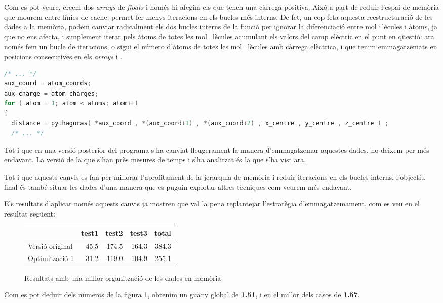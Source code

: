 Com es pot veure, creem dos \emph{arrays} de \emph{floats} i només hi afegim els que tenen una càrrega positiva. Això a part de reduir l'espai de memòria que mourem entre línies de cache, permet fer menys iteracions en els bucles més interns. De fet, un cop feta aquesta reestructuració de les dades a la memòria, podem canviar radicalment els dos bucles interns de la funció per ignorar la diferenciació entre mol·lècules i àtoms, ja que no ens afecta, i simplement iterar pels àtoms de totes les mol·lècules acumulant els valors del camp elèctric en el punt en qüestió: ara només fem un bucle de  iteracions, o sigui el número d'àtoms de totes les mol·lècules amb càrrega elèctrica, i que tenim emmagatzemats en posicions consecutives en els \emph{arrays}  i .

\begin{lstlisting}[label=mem2, caption=Bucle intern que substitueix els anteriors 2 bucles més interns, language=C]
/* ... */
aux_coord = atom_coords;
aux_charge = atom_charges;
for ( atom = 1; atom < atoms; atom++)
{
  distance = pythagoras( *aux_coord , *(aux_coord+1) , *(aux_coord+2) , x_centre , y_centre , z_centre ) ;
  /* ... */
\end{lstlisting}

Tot i que en una versió posterior del programa s'ha canviat lleugerament la manera d'emmagatzemar aquestes dades, ho deixem per més endavant. La versió de la que s'han près mesures de temps i s'ha analitzat és la que s'ha vist ara.

Tot i que aquests canvis es fan per millorar l'aprofitament de la jerarquia de memòria i reduir iteracions en els bucles interns, l'objectiu final és també situar les dades d'una manera que es puguin explotar altres tècniques com veurem més endavant.

Els resultats d'aplicar només aquests canvis ja mostren que val la pena replantejar l'estratègia d'emmagatzemament, com es veu en el resultat següent:

\begin{figure}[ht]
  \caption{Resultats amb una millor organització de les dades en memòria}\label{fig:elapsed_1}
  \begin{center}
    \begin{tabular}{ l r r r r }
      & test1 & test2 & test3 & total \\
      \hline
      Versió original & 45.5 & 174.5 & 164.3 & 384.3 \\
      Optimització 1 & 31.2 & 119.0 & 104.9 & 255.1 \\
    \end{tabular}
  \end{center}
\end{figure}

Com es pot deduir dels números de la figura \ref{fig:elapsed_1}, obtenim un guany global de \textbf{1.51}, i en el millor dels casos de \textbf{1.57}.

